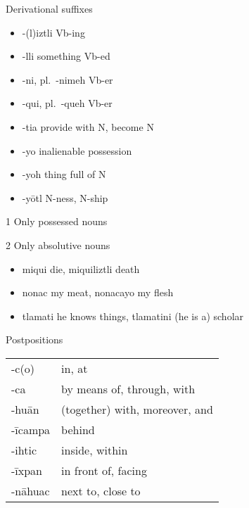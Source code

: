 \documentclass[12pt]{beamer}
\newcommand{\nah}[1]{\textcolor{nahgrn}{#1}}
\newcommand{\trs}[1]{\textcolor{nahblu}{#1}}
\begin{document}
\begin{frame}
\begin{columns}[t]
\begin{column}{.23\linewidth}
\begin{block}{Derivational suffixes}
\begin{threeparttable}
\begin{itemize}
						\item \nah{-(l)iztli} \trs{Vb-ing}
						\item \nah{-lli} \trs{something Vb-ed}
						\item \nah{-ni}, pl.~\nah{-nimeh}  \trs{Vb-er}
						\item \nah{-qui}, pl.~\nah{-queh}  \trs{Vb-er}
						\item \nah{-tia} \trs{provide with N, become N}
						\item \nah{-yo} inalienable possession
						\item \nah{-yoh} \trs{thing full of N}
						\item \nah{-yōtl} \trs{N-ness, N-ship}
					\end{itemize}
					\begin{tablenotes}
						\item[1] Only possessed nouns
						\item[2] Only absolutive nouns
					\end{tablenotes}
				\end{threeparttable}
			\end{block}
			\begin{example}
				\begin{itemize}
					\item \nah{miqui} \trs{die}, \nah{miquiliztli} \trs{death}
					\item \nah{nonac} \trs{my meat}, \nah{nonacayo} \trs{my flesh}
					\item \nah{tlamati} \trs{he knows things}, \nah{tlamatini} \trs{(he is a) scholar}
				\end{itemize}
			\end{example}
			\begin{block}{Postpositions}
				\begin{tabular}{ll}
					\nah{-c(o)}     & \trs{in, at}                         \\
					\nah{-ca}       & \trs{by means of, through, with}     \\
					\nah{-huān}     & \trs{(together) with, moreover, and} \\
					\nah{-īcampa}   & \trs{behind}                         \\
					\nah{-ihtic}    & \trs{inside, within}                 \\
					\nah{-īxpan}    & \trs{in front of, facing}            \\
					\nah{-nāhuac}   & \trs{next to, close to}              \\

\end{tabular}
\end{block}
\end{column}
\end{columns}
\end{frame}
\end{document}
